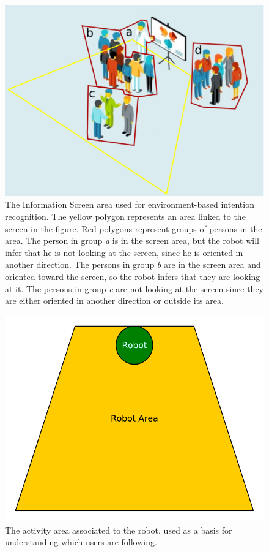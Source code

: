 \begin{figure}[ht!]
	\centering
	\includegraphics[scale=0.45]{img/case_study/spencer/environment_intention.pdf}
	\caption[Environment-Based Situation Assessment]{The Information Screen area used for environment-based intention recognition. The yellow polygon represents an area linked to the screen in the figure. Red polygons represent groups of persons in the area. The person in group \textit{a} is in the screen area, but the robot will infer that he is not looking at the screen, since he is oriented in another direction. The persons in group \textit{b} are in the screen area and oriented toward the screen, so the robot infers that they are looking at it. The persons in group \textit{c} are not looking at the screen since they are either oriented in another direction or outside its area.}
	\label{fig:spencer-screen_area}
\end{figure}

\begin{figure}[ht!]
	\centering
	\includegraphics[scale=0.45]{img/case_study/spencer/robot_area.pdf}
	\caption[Environment-Based Situation Assessment 2]{The activity area associated to the robot, used as a basis for understanding which users are following.}
	\label{fig:spencer-robot_area}
\end{figure}

